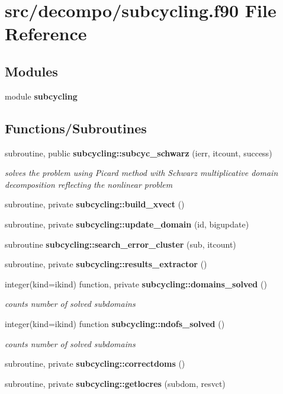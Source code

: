 \section{src/decompo/subcycling.f90 File Reference}
\label{subcycling_8f90}
\subsection*{Modules}
\begin{DoxyCompactItemize}
\item 
module {\bf subcycling}
\end{DoxyCompactItemize}
\subsection*{Functions/\+Subroutines}
\begin{DoxyCompactItemize}
\item 
subroutine, public {\bf subcycling\+::subcyc\+\_\+schwarz} (ierr, itcount, success)
\begin{DoxyCompactList}\small\item\em solves the problem using Picard method with Schwarz multiplicative domain decomposition reflecting the nonlinear problem \end{DoxyCompactList}\item 
subroutine, private {\bf subcycling\+::build\+\_\+xvect} ()
\item 
subroutine, private {\bf subcycling\+::update\+\_\+domain} (id, bigupdate)
\item 
subroutine {\bf subcycling\+::search\+\_\+error\+\_\+cluster} (sub, itcount)
\item 
subroutine, private {\bf subcycling\+::results\+\_\+extractor} ()
\item 
integer(kind=ikind) function, private {\bf subcycling\+::domains\+\_\+solved} ()
\begin{DoxyCompactList}\small\item\em counts number of solved subdomains \end{DoxyCompactList}\item 
integer(kind=ikind) function {\bf subcycling\+::ndofs\+\_\+solved} ()
\begin{DoxyCompactList}\small\item\em counts number of solved subdomains \end{DoxyCompactList}\item 
subroutine, private {\bf subcycling\+::correctdoms} ()
\item 
subroutine, private {\bf subcycling\+::getlocres} (subdom, resvct)
\end{DoxyCompactItemize}
